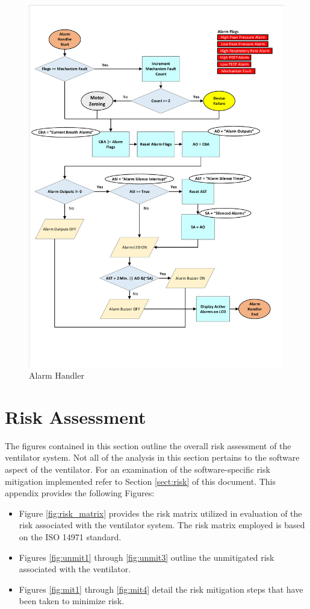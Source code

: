 \documentclass[]{article}
\begin{document}
\begin{appendices}
\begin{figure}
	\includegraphics[scale= 0.82, trim=15 70 15 50, clip]{figures/alarm_handler.pdf}
	\caption{Alarm Handler}
	\label{fig:alarm_dloop}
\end{figure}
\label{app:dsfd}

\section{Risk Assessment}
The figures contained in this section outline the overall risk assessment of the ventilator system. Not all of the analysis in this section pertains to the software aspect of the ventilator.  For an examination of the software-specific risk mitigation implemented refer to Section \ref{sect:risk} of this document.
This appendix provides the following Figures:
\begin{itemize}
	\item Figure \ref{fig:risk_matrix} provides the risk matrix utilized in evaluation of the risk associated with the ventilator system.  The risk matrix employed is based on the ISO 14971 standard.
	\item Figures \ref{fig:unmit1} through \ref{fig:unmit3} outline the unmitigated risk associated with the ventilator.
	\item Figures \ref{fig:mit1} through \ref{fig:mit4} detail the risk mitigation steps that have been taken to minimize risk.
\end{itemize}


\end{appendices}
\end{document}
